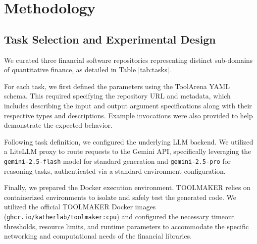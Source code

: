 \documentclass[11pt]{article}
\begin{document}
\section{Methodology}

\subsection{Task Selection and Experimental Design}

We curated three financial software repositories representing distinct sub-domains of quantitative finance, as detailed in Table \ref{tab:tasks}.

\begin{table}[htbp]
  \centering
  \caption{Quant-Bench tasks.}
  \label{tab:tasks}
\end{table}

For each task, we first defined the parameters using the ToolArena YAML schema. This required specifying the repository URL and metadata, which includes describing the input and output argument specifications along with their respective types and descriptions. Example invocations were also provided to help demonstrate the expected behavior. 

Following task definition, we configured the underlying LLM backend. We utilized a LiteLLM proxy to route requests to the Gemini API, specifically leveraging the \texttt{gemini-2.5-flash} model for standard generation and \texttt{gemini-2.5-pro} for reasoning tasks, authenticated via a standard environment configuration. 

Finally, we prepared the Docker execution environment. TOOLMAKER relies on containerized environments to isolate and safely test the generated code. We utilized the official TOOLMAKER Docker images (\texttt{ghcr.io/katherlab/toolmaker:cpu}) and configured the necessary timeout thresholds, resource limits, and runtime parameters to accommodate the specific networking and computational needs of the financial libraries.
\end{document}
